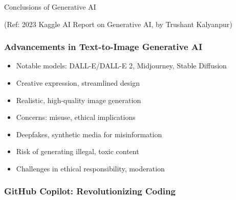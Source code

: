 \begin{frame}[fragile]\frametitle{}
\begin{center}
{\Large Conclusions of Generative AI}
\end{center}

{\tiny (Ref: 2023 Kaggle AI Report on Generative AI, by Trushant Kalyanpur)}

\end{frame}

\begin{frame}[fragile]\frametitle{Advancements in Text-to-Image Generative AI}
    \begin{itemize}
        \item Notable models: DALL-E/DALL-E 2, Midjourney, Stable Diffusion
        \item Creative expression, streamlined design
        \item Realistic, high-quality image generation
        \item Concerns: misuse, ethical implications
        \item Deepfakes, synthetic media for misinformation
        \item Risk of generating illegal, toxic content
        \item Challenges in ethical responsibility, moderation
    \end{itemize}
\end{frame}

\begin{frame}[fragile]\frametitle{GitHub Copilot: Revolutionizing Coding}
\end{frame}

